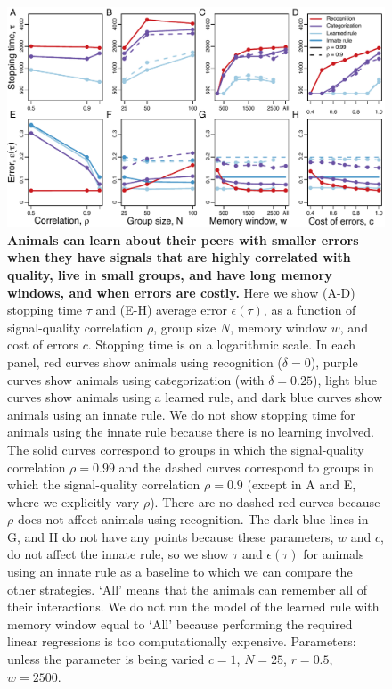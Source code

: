 \begin{figure}
\includegraphics[width=6.85in]{figures/parameters_exploration.pdf}
\caption{\sffamily\small\textbf{Animals can learn about their peers with smaller errors when they have signals that are highly correlated with quality, live in small groups, and have long memory windows, and when errors are costly.} Here we show (A-D) stopping time $\tau$ and (E-H) average error $\epsilon(\tau)$, as a function of signal-quality correlation $\rho$, group size $N$, memory window $w$, and cost of errors $c$. Stopping time is on a logarithmic scale. In each panel, red curves show animals using recognition ($\delta=0$), purple curves show animals using categorization (with $\delta=0.25$), light blue curves show animals using a learned rule, and dark blue curves show animals using an innate rule. We do not show stopping time for animals using the innate rule because there is no learning involved.  The solid curves correspond to groups in which the signal-quality correlation $\rho=0.99$ and the dashed curves correspond to groups in which the signal-quality correlation $\rho=0.9$ (except in A and E, where we explicitly vary $\rho$). There are no dashed red curves because $\rho$ does not affect animals using recognition. The dark blue lines in G, and H do not have any points because these parameters, $w$ and $c$, do not affect the innate rule, so we show $\tau$ and $\epsilon(\tau)$ for animals using an innate rule as a baseline to which we can compare the other strategies. `All' means that the animals can remember all of their interactions. We do not run the model of the learned rule with memory window equal to `All' because performing the required linear regressions is too computationally expensive. Parameters: unless the parameter is being varied $c=1$, $N=25$, $r=0.5$, $w=2500$.}
\label{parameters}
\end{figure}

